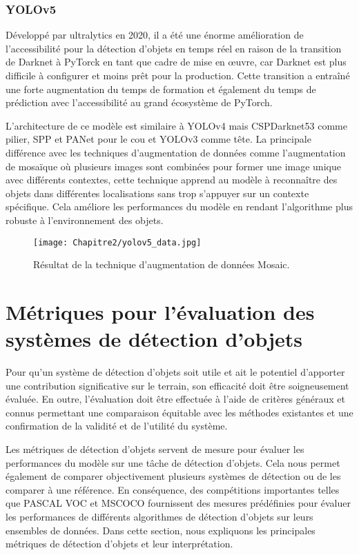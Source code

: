 \subsubsection{YOLOv5} 
Développé par ultralytics en 2020, il a été une énorme amélioration de l'accessibilité pour la détection d'objets en temps réel en raison de la transition de Darknet à PyTorck en tant que cadre de mise en œuvre, car Darknet est plus difficile à configurer et moins prêt pour la production. Cette transition a entraîné une forte augmentation du temps de formation et également du temps de prédiction avec l'accessibilité au grand écosystème de PyTorch.          

L'architecture de ce modèle est similaire à YOLOv4 mais CSPDarknet53 comme pilier, SPP et PANet pour le cou et YOLOv3 comme tête. La principale différence avec les techniques d'augmentation de données comme l'augmentation de mosaïque où plusieurs images sont combinées pour former une image unique avec différents contextes, cette technique apprend au modèle à reconnaître des objets dans différentes localisations sans trop s'appuyer sur un contexte spécifique. Cela améliore les performances du modèle en rendant l'algorithme plus robuste à l'environnement des objets.
\begin{figure}[H]
          \centering
          \texttt{[image: Chapitre2/yolov5\_data.jpg]}
          \caption{Résultat de la technique d'augmentation de données Mosaic.}
          \label{yolov5_mosa}
          \end{figure}

\section{Métriques pour l'évaluation des systèmes de détection d'objets} 
Pour qu'un système de détection d'objets soit utile et ait le potentiel d'apporter une contribution significative sur le terrain, son efficacité doit être soigneusement évaluée. En outre, l'évaluation doit être effectuée à l'aide de critères généraux et connus permettant une comparaison équitable avec les méthodes existantes et une confirmation de la validité et de l'utilité du système.

Les métriques de détection d'objets servent de mesure pour évaluer les performances du modèle sur une tâche de détection d'objets. Cela nous permet également de comparer objectivement plusieurs systèmes de détection ou de les comparer à une référence. En conséquence, des compétitions importantes telles que PASCAL VOC et MSCOCO fournissent des mesures prédéfinies pour évaluer les performances de différents algorithmes de détection d'objets sur leurs ensembles de données. Dans cette section, nous expliquons les principales métriques de détection d'objets et leur interprétation.
